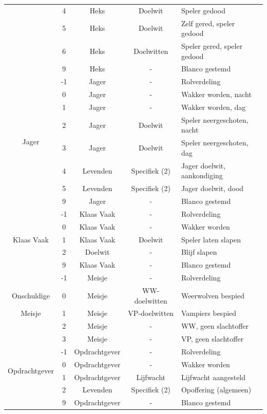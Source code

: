 \documentclass[12pt]{article}
\begin{document}
\begin{center}
\begin{longtable}{c|c|c|c|l}
       & 4 & Heks & Doelwit & Speler gedood \\
       & 5 & Heks & Doelwit & Zelf gered, speler gedood \\
       & 6 & Heks & Doelwitten & Speler gered, speler gedood \\
       & 9 & Heks & - & Blanco gestemd \\
      \hline
      \multirow{8}{*}{Jager} & -1 & Jager & - & Rolverdeling \\
       & 0 & Jager & - & Wakker worden, nacht \\
       & 1 & Jager & - & Wakker worden, dag \\
       & 2 & Jager & Doelwit & Speler neergeschoten, nacht \\
       & 3 & Jager & Doelwit & Speler neergeschoten, dag \\
       & 4 & Levenden & Specifiek (2) & Jager doelwit, aankondiging \\
       & 5 & Levenden & Specifiek (2) & Jager doelwit, dood \\
       & 9 & Jager & - & Blanco gestemd \\
      \hline
      \multirow{5}{*}{Klaas Vaak} & -1 & Klaas Vaak & - & Rolverdeling \\
       & 0 & Klaas Vaak & - & Wakker worden \\
       & 1 & Klaas Vaak & Doelwit & Speler laten slapen \\
       & 2 & Doelwit & - & Blijf slapen \\
       & 9 & Klaas Vaak & - & Blanco gestemd \\
      \hline
       & -1 & Meisje & - & Rolverdeling \\
      Onschuldige & 0 & Meisje & WW-doelwitten & Weerwolven bespied \\
      Meisje & 1 & Meisje & VP-doelwitten & Vampiers bespied \\
       & 2 & Meisje & - & WW, geen slachtoffer \\
       & 3 & Meisje & - & VP, geen slachtoffer \\
      \hline
      \multirow{4}{*}{Opdrachtgever} & -1 & Opdrachtgever & - & Rolverdeling \\
       & 0 & Opdrachtgever & - & Wakker worden \\
       & 1 & Opdrachtgever & Lijfwacht & Lijfwacht aangesteld \\
       & 2 & Levenden & Specifiek (2) & Opoffering (algemeen) \\
       & 9 & Opdrachtgever & - & Blanco gestemd \\

\end{longtable}
\end{center}
\end{document}
